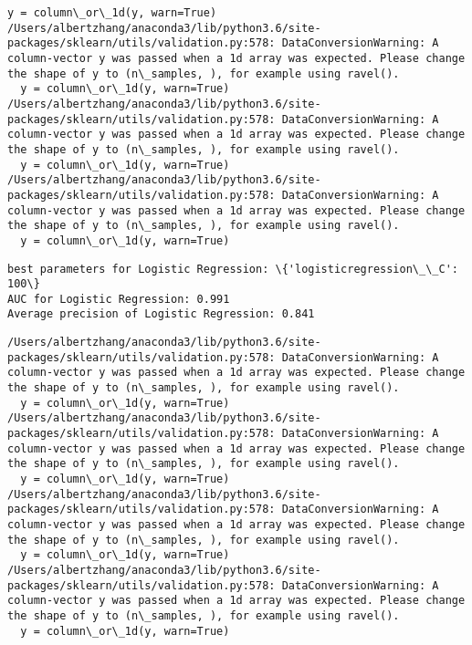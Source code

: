 \documentclass[11pt]{article}
\begin{document}
\begin{Verbatim}[commandchars=\\\{\}]
  y = column\_or\_1d(y, warn=True)
/Users/albertzhang/anaconda3/lib/python3.6/site-packages/sklearn/utils/validation.py:578: DataConversionWarning: A column-vector y was passed when a 1d array was expected. Please change the shape of y to (n\_samples, ), for example using ravel().
  y = column\_or\_1d(y, warn=True)
/Users/albertzhang/anaconda3/lib/python3.6/site-packages/sklearn/utils/validation.py:578: DataConversionWarning: A column-vector y was passed when a 1d array was expected. Please change the shape of y to (n\_samples, ), for example using ravel().
  y = column\_or\_1d(y, warn=True)
/Users/albertzhang/anaconda3/lib/python3.6/site-packages/sklearn/utils/validation.py:578: DataConversionWarning: A column-vector y was passed when a 1d array was expected. Please change the shape of y to (n\_samples, ), for example using ravel().
  y = column\_or\_1d(y, warn=True)

    \end{Verbatim}

    \begin{Verbatim}[commandchars=\\\{\}]
best parameters for Logistic Regression: \{'logisticregression\_\_C': 100\}
AUC for Logistic Regression: 0.991
Average precision of Logistic Regression: 0.841

    \end{Verbatim}

    \begin{Verbatim}[commandchars=\\\{\}]
/Users/albertzhang/anaconda3/lib/python3.6/site-packages/sklearn/utils/validation.py:578: DataConversionWarning: A column-vector y was passed when a 1d array was expected. Please change the shape of y to (n\_samples, ), for example using ravel().
  y = column\_or\_1d(y, warn=True)
/Users/albertzhang/anaconda3/lib/python3.6/site-packages/sklearn/utils/validation.py:578: DataConversionWarning: A column-vector y was passed when a 1d array was expected. Please change the shape of y to (n\_samples, ), for example using ravel().
  y = column\_or\_1d(y, warn=True)
/Users/albertzhang/anaconda3/lib/python3.6/site-packages/sklearn/utils/validation.py:578: DataConversionWarning: A column-vector y was passed when a 1d array was expected. Please change the shape of y to (n\_samples, ), for example using ravel().
  y = column\_or\_1d(y, warn=True)
/Users/albertzhang/anaconda3/lib/python3.6/site-packages/sklearn/utils/validation.py:578: DataConversionWarning: A column-vector y was passed when a 1d array was expected. Please change the shape of y to (n\_samples, ), for example using ravel().
  y = column\_or\_1d(y, warn=True)

    \end{Verbatim}
\end{document}
